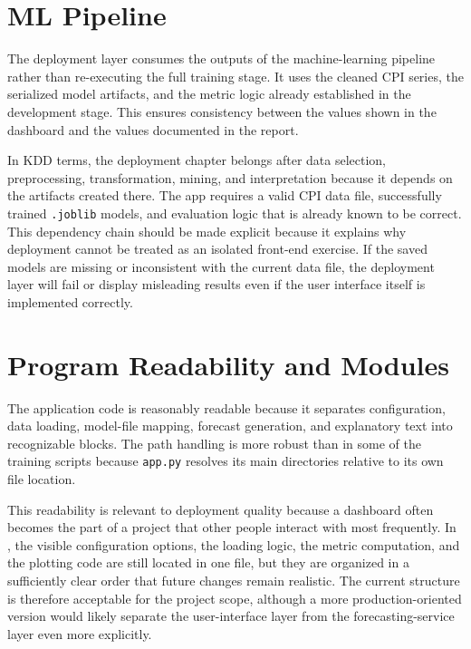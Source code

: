 \section{ML Pipeline}

The deployment layer consumes the outputs of the machine-learning pipeline rather than re-executing the full training stage. It uses the cleaned CPI series, the serialized model artifacts, and the metric logic already established in the development stage. This ensures consistency between the values shown in the dashboard and the values documented in the report.

In KDD terms, the deployment chapter belongs after data selection, preprocessing, transformation, mining, and interpretation because it depends on the artifacts created there. The app requires a valid CPI data file, successfully trained \texttt{.joblib} models, and evaluation logic that is already known to be correct. This dependency chain should be made explicit because it explains why deployment cannot be treated as an isolated front-end exercise. If the saved models are missing or inconsistent with the current data file, the deployment layer will fail or display misleading results even if the user interface itself is implemented correctly.

\section{Program Readability and Modules}

The application code is reasonably readable because it separates configuration, data loading, model-file mapping, forecast generation, and explanatory text into recognizable blocks. The path handling is more robust than in some of the training scripts because \texttt{app.py} resolves its main directories relative to its own file location.

This readability is relevant to deployment quality because a dashboard often becomes the part of a project that other people interact with most frequently. In , the visible configuration options, the loading logic, the metric computation, and the plotting code are still located in one file, but they are organized in a sufficiently clear order that future changes remain realistic. The current structure is therefore acceptable for the project scope, although a more production-oriented version would likely separate the user-interface layer from the forecasting-service layer even more explicitly.

